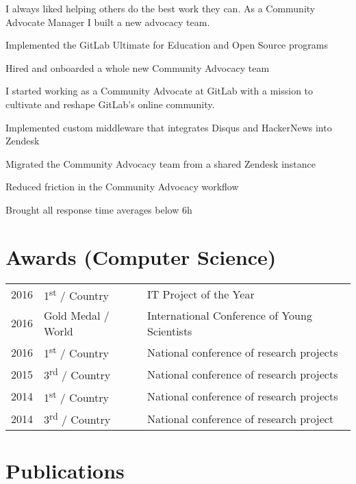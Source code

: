 \documentclass[]{matija-resume}
\begin{document}
\begin{minipage}[t]{0.66\textwidth}
\vspace{\topsep}
I always liked helping others do the best work they can. As a Community Advocate Manager I built a new advocacy team.
\vspace{\topsep}
\begin{tightemize}
\item Implemented the GitLab Ultimate for Education and Open Source programs
\item Hired and onboarded a whole new Community Advocacy team
\end{tightemize}
\sectionsep

\vspace{\topsep}
I started working as a Community Advocate at GitLab with a mission to cultivate and reshape GitLab's online community.
\vspace{\topsep}
\begin{tightemize}
\item Implemented custom middleware that integrates Disqus and HackerNews into Zendesk
\item Migrated the Community Advocacy team from a shared Zendesk instance
\item Reduced friction in the Community Advocacy workflow
\item Brought all response time averages below 6h
\end{tightemize}
\sectionsep


\section{Awards (Computer Science)}
\begin{tabular}{rll}
2016 & 1\textsuperscript{st} / Country & IT Project of the Year\\
2016 & Gold Medal / World & International Conference of Young Scientists\\
2016 & 1\textsuperscript{st} / Country & National conference of research projects\\
2015 & 3\textsuperscript{rd} / Country & National conference of research projects\\
2014 & 1\textsuperscript{st} / Country & National conference of research projects\\
2014 & 3\textsuperscript{rd} / Country & National conference of research project
\end{tabular}
\sectionsep


\section{Publications}
\renewcommand\refname{\vskip -1.5em} %


\nocite{*}

\end{minipage}
\end{document}
